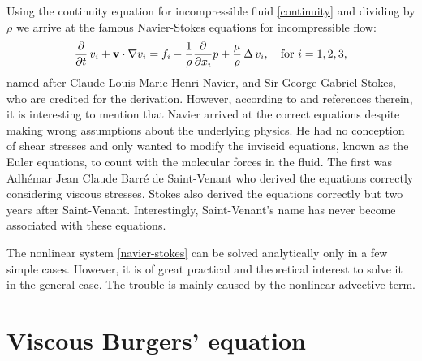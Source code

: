 \documentclass[../include.tex]{subfiles}
\begin{document}
Using the continuity equation for incompressible fluid \eqref{continuity} and dividing by $ \rho $ we arrive at the famous Navier-Stokes equations for incompressible flow:
\begin{equation}
	\label{navier-stokes}
	\frac{\partial}{\partial t} \,v_i  + \mathbf{v} \cdot \nabla v_i =\\
	f_i - \frac{1}{\rho} \frac{\partial}{\partial x_i} p + \frac{\mu}{\rho}\,\Delta\, v_i, \quad \textrm{for } i = 1, 2, 3,
\end{equation}
named after Claude-Louis Marie Henri Navier, and Sir George Gabriel Stokes, who are credited for the derivation. However, according to \cite{mathshistory} and references therein, it is interesting to mention that Navier arrived at the correct equations despite making wrong assumptions about the underlying physics. He had no conception of shear stresses and only wanted to modify the inviscid equations, known as the Euler equations, to count with the molecular forces in the fluid. The first was Adhémar Jean Claude Barré de Saint-Venant who derived the equations correctly considering viscous stresses. Stokes also derived the equations correctly but two years after Saint-Venant. Interestingly, Saint-Venant's name has never become associated with these equations.
\par The nonlinear system \eqref{navier-stokes} can be solved analytically only in a few simple cases. However, it is of great practical and theoretical interest to solve it in the general case. The trouble is mainly caused by the nonlinear advective term.
\section{Viscous Burgers' equation}
\end{document}
